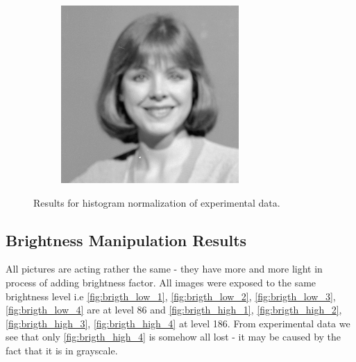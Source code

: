 \documentclass{article}
\begin{document}
\begin{figure}[h]
\begin{subfigure}{.3\textwidth}
    \caption{}
      \label{fig:average_hist_4}
\end{subfigure}
\begin{subfigure}{.3\textwidth}
  \centering
  \includegraphics[width=0.97\linewidth]{_Figures/sample_4_normalization_per_channel.png}
    \caption{}
        \label{fig:per_hist_4}
\end{subfigure}


\caption{Results for histogram normalization of experimental data. }
\label{fig:histogram_results}
\end{figure}

%
%
\subsection{Brightness Manipulation Results}
All pictures are acting rather the same - they have more and more light in process of adding brightness factor. All images were exposed to the same brightness level i.e \ref{fig:brigth_low_1}, \ref{fig:brigth_low_2}, \ref{fig:brigth_low_3}, \ref{fig:brigth_low_4} are at level 86 and \ref{fig:brigth_high_1}, \ref{fig:brigth_high_2}, \ref{fig:brigth_high_3}, \ref{fig:brigth_high_4} at level 186. From experimental data we see that only \ref{fig:brigth_high_4} is somehow all lost - it may be caused by the fact that it is in grayscale.
\end{document}
